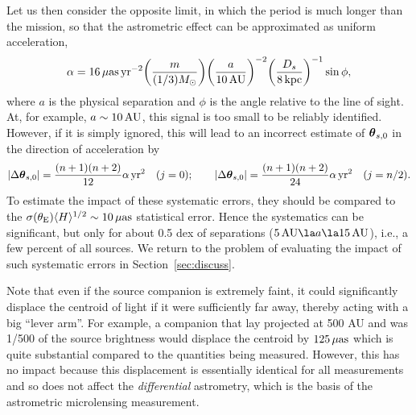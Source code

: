 \documentclass[12pt,preprint]{aastex}
\newcommand{\bdv}[1]{\mbox{\boldmath$#1$}}
\def\au{{\rm AU}}
\def\e{{\rm E}}
\def\btheta{{\bdv\theta}}
\def\muas{{\mu\rm as}}
\begin{document}
Let us then consider the opposite limit, in which the period is much
longer than the mission, so that the astrometric effect can be approximated
as uniform acceleration,
\begin{equation}
\alpha = 16\,\muas\,{\rm yr}^{-2}
\biggl({m\over (1/3)M_\odot}\biggr)
\biggl({a\over 10\,\au}\biggr)^{-2}
\biggl({D_s\over {\rm 8\,kpc}}\biggr)^{-1}
\sin\phi,
\label{eqn:uniform}
\end{equation}
where $a$ is the physical separation and $\phi$ is the angle relative
to the line of sight.  At, for example, $a\sim 10\,\au$, this signal
is too small to be reliably identified. However, if it is simply
ignored, this will lead to an incorrect estimate of $\btheta_{s,0}$ in
the direction of acceleration by
\begin{equation}
|\Delta\btheta_{s,0}| = {(n+1)(n+2)\over 12}\alpha\,{\rm yr}^2
\quad (j=0);
\qquad
|\Delta\btheta_{s,0}| = {(n+1)(n+2)\over 24}\alpha\,{\rm yr}^2
\quad (j=n/2).
\label{eqn:offset}
\end{equation}
To estimate the impact of these systematic errors, they should
be compared to the $\sigma(\theta_\e)\langle H \rangle^{1/2}\sim 10\,\muas$
statistical error.  Hence the systematics can be significant, but
only for about 0.5 dex of separations ($5\,\au\la a \la 15\,\au$), 
i.e., a few percent of all 
sources.  We return to the problem of evaluating the impact of
such systematic errors in Section~\ref{sec:discuss}.

Note that even if the source companion is extremely faint, it could
significantly displace the centroid of light if it were sufficiently
far away, thereby acting with a big 
``lever arm''.  For example, a companion that lay projected
at 500 AU and was 1/500 of the source brightness would displace the
centroid by $125\,\muas$ which is quite substantial compared to the 
quantities being measured.  However, this has no impact because
this displacement is essentially identical for all measurements and
so does not affect the {\it differential} astrometry, which is the
basis of the astrometric microlensing measurement.
\end{document}
